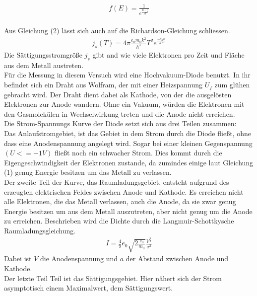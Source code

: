 \begin{align}
f(E)=\frac{1}{e^\frac{E-\zeta}{kT}}
\end{align}
\\
Aus Gleichung (2) lässt sich auch auf die Richardson-Gleichung schliessen.
\begin{align}
j_s(T)=4\pi\frac{e_0 m_0 k^2}{h^3}T^2e^\frac{-e_0\phi}{kT}
\end{align}
Die Sättigungsstromgröße $j_s$ gibt and wie viele Elektronen pro Zeit und Fläche aus dem Metall austreten.
\\
Für die Messung in diesem Versuch wird eine Hochvakuum-Diode benutzt. In ihr befindet sich ein Draht aus Wolfram, der mit einer Heizspannung $U_f$ zum glühen gebracht wird. Der Draht dient dabei als Kathode, von der die ausgelösten Elektronen zur Anode wandern. Ohne ein Vakuum, würden die Elektronen mit den Gasmolekülen in Wechselwirkung treten und die Anode nicht erreichen.
\\
Die Strom-Spannungs Kurve der Diode setzt sich aus drei Teilen zusammen:
\\
Das Anlaufstromgebiet, ist das Gebiet in dem Strom durch die Diode fließt, ohne dass eine Anodenspannung angelegt wird. Sogar bei einer kleinen Gegenspannung $(U<=-1V)$ fließt noch ein schwacher Strom. Dies kommt durch die Eigengeschwindigkeit der Elektronen zustande, da zumindes einige laut Gleichung (1) genug Energie besitzen um das Metall zu verlassen.
\\
Der zweite Teil der Kurve, das Raumladungsgebiet, entsteht aufgrund des erzeugten elektrischen Feldes zwischen Anode und Kathode. Es erreichen nicht alle Elektronen, die das Metall verlassen, auch die Anode, da sie zwar genug Energie besitzen  um aus dem Metall auszutreten, aber nicht genug um die Anode zu erreichen.
Beschrieben wird die Dichte durch die Langmuir-Schottkysche Raumladungsgleichung.
\begin{align}
I=\frac49e_0\sqrt{2\frac{e_0}{m_0}}\frac{V^\frac32}{a^2}
\end{align}
Dabei ist $V$ die Anodenspannung und $a$ der Abstand zwischen Anode und Kathode.
\\
Der letzte Teil Teil ist das Sättigungsgebiet. Hier nähert sich der Strom asymptotisch einem Maximalwert, dem Sättigungswert.



